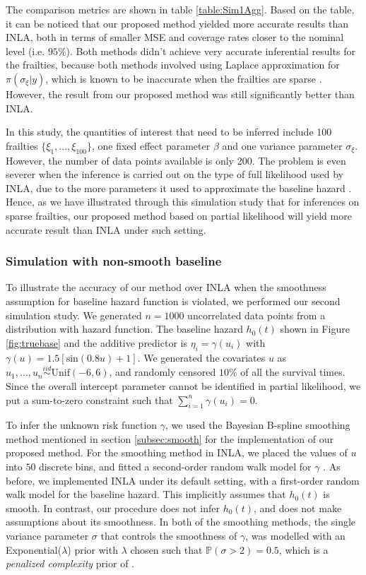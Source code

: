 \documentclass[ba]{imsart}
\begin{document}
The comparison metrics are shown in table \ref{table:Sim1Agg}. Based on the table, it can be noticed that our proposed method yielded more accurate results than INLA, both in terms of smaller MSE and coverage rates closer to the nominal level (i.e. $95\%$). Both methods didn't achieve very accurate inferential results for the frailties, because both methods involved using Laplace approximation for $\pi(\sigma_\xi|y)$, which is known to be inaccurate when the frailties are sparse \citep{Ogden2013ASR}. However, the result from our proposed method was still significantly better than INLA.

In this study, the quantities of interest that need to be inferred include 100 frailties $\{\xi_1,...,\xi_{100}\}$, one fixed effect parameter $\beta$ and one variance parameter $\sigma_\xi$. However, the number of data points available is only 200. The problem is even severer when the inference is carried out on the type of full likelihood used by INLA, due to the more parameters it used to approximate the baseline hazard \citep{coxdiscussion}. Hence, as we have illustrated through this simulation study that for inferences on sparse frailties, our proposed method based on partial likelihood will yield more accurate result than INLA under such setting.

\subsubsection{Simulation with non-smooth baseline}\label{subsubsec:sim2}

To illustrate the accuracy of our method over INLA when the smoothness assumption for baseline hazard function is violated, we performed our second simulation study. We generated $n = 1000$ uncorrelated data points from a distribution with hazard function. The baseline hazard $h_{0}(t)$ shown in Figure \ref{fig:truebase} and the additive predictor is $\eta_{i} = \gamma\left(u_{i}\right)$ with $\gamma(u) = 1.5 [ \text{sin}(0.8u) + 1 ]$. We generated the covariates $u$ as  $u_{1},\ldots,u_{n}\overset{iid}{\sim}\text{Unif}(-6,6)$, and randomly censored $10\%$ of all the survival times. Since the overall intercept parameter cannot be identified in partial likelihood, we put a sum-to-zero constraint such that $\sum_{i=1}^{n} \gamma{(u_i)} = 0$.

To infer the unknown risk function $\gamma$, we used the Bayesian B-spline smoothing method mentioned in section \ref{subsec:smooth} for the implementation of our proposed method. For the smoothing method in INLA, we placed the values of $u$ into $50$ discrete bins, and fitted a second-order random walk model for $\gamma$ \citep{rw2}. As before, we implemented INLA under its default setting, with a first-order random walk model for the baseline hazard. This implicitly assumes that $h_{0}(t)$ is smooth. In contrast, our procedure does not infer $h_{0}(t)$, and does not make assumptions about its smoothness. In both of the smoothing methods, the single variance parameter $\sigma$ that controls the smoothness of $\gamma$, was modelled with an Exponential($\lambda$) prior with $\lambda$ chosen such that $\mathbb{P}\left( \sigma > 2\right) = 0.5$, which is a \emph{penalized complexity} prior of \cite{pcprior}.
\end{document}
